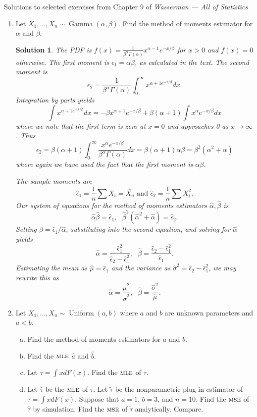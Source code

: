\documentclass[10pt]{article}
\newtheorem*{sol}{Solution}
\newcommand{\Unif}{\operatorname{Uniform}}
\newcommand{\Gam}{\operatorname{Gamma}}
\newcommand{\MSE}{\textsc{mse}}
\newcommand{\MLE}{\textsc{mle}}
\begin{document}
\noindent \large{Solutions to selected exercises from Chapter 9 of
\emph{Wasserman --- All of Statistics}}

\begin{enumerate}
\item[(1)] Let $X_1,\ldots,X_n\sim \Gam(\alpha,\beta)$. Find the method of
moments estimator for $\alpha$ and $\beta$.

\begin{sol}
The PDF is $f(x)=\frac{1}{\beta^\alpha \Gamma(\alpha)}x^{\alpha-1}e^{-x/\beta}$
for $x>0$ and $f(x)=0$ otherwise.
The first moment is $\epsilon_1=\alpha\beta$, as calculated in the text.
The second moment is
\[
\epsilon_2 = \frac{1}{\beta^\alpha \Gamma(\alpha)}
\int_0^\infty x^{\alpha+1e^{-x/\beta}}dx.
\]
Integration by parts yields
\[
\int x^{\alpha+1e^{-x/\beta}}dx = -\beta x^{\alpha+1}e^{-x/\beta} +
\beta(\alpha+1)\int x^{\alpha}e^{-x/\beta}dx
\]
where we note that the first term is zero at $x=0$ and approaches 0 as
$x\to \infty$.
Thus
\[
\epsilon_2 =
\beta(\alpha+1)\int_0^\infty \frac{x^\alpha e^{-x/\beta}}{\beta^\alpha\Gamma(\alpha)}dx
= \beta(\alpha+1)\alpha\beta=\beta^2(\alpha^2+\alpha)
\]
where again we have used the fact that the first moment is $\alpha\beta$.

The sample moments are
\[
\hat \epsilon_1 = \frac{1}{n} \sum X_i = \overline{X_n} \text{ and }
\hat \epsilon_2 = \frac{1}{n} \sum X_i^2.
\]
Our system of equations for the method of moments estimators
$\hat \alpha, \hat \beta$ is
\[
\hat \alpha \hat \beta = \hat \epsilon_1, \ \ \
\hat \beta^2 (\hat \alpha^2 + \hat \alpha) = \hat \epsilon_2.
\]
Setting $\hat \beta=\hat \epsilon_1 / \hat \alpha$, substituting into the
second equation, and solving for $\hat \alpha$ yields
\[
\hat \alpha = \frac{\hat \epsilon_1^2}{\hat \epsilon_2 - \hat \epsilon_1^2}, \ \ \
\hat \beta = \frac{\hat \epsilon_2 - \hat \epsilon_1^2}{\hat \epsilon_1}.
\]
Estimating the mean as $\hat \mu = \hat \epsilon_1$ and the variance as
$\hat \sigma^2 = \hat \epsilon_2 - \hat \epsilon_1^2$, we may rewrite this as
\[
\hat \alpha = \frac{\hat \mu^2}{\hat \sigma^2}, \ \ \
\hat \beta = \frac{\hat \sigma^2}{\hat \mu}.
\]
\end{sol}

\item[(2)]
Let $X_1,\ldots,X_n \sim \Unif(a, b)$ where $a$ and $b$ are unknown parameters
and $a < b$.
\begin{enumerate}[(a)]
\item Find the method of moments estimators for $a$ and $b$.
\item Find the $\MLE$ $\hat a$ and $\hat b$.
\item Let $\tau = \int x dF(x)$. Find the $\MLE$ of $\tau$.
\item Let $\hat\tau$ be the $\MLE$ of $\tau$. Let $\tilde \tau$
be the nonparametric plug-in estimator
of $\tau = \int x dF(x)$. Suppose that $a=1$, $b=3$, and $n=10$. Find the $\MSE$
of $\hat\tau$ by simulation. Find the $\MSE$ of $\tilde\tau$ analytically. Compare.
\end{enumerate}


\end{enumerate}
\end{document}

